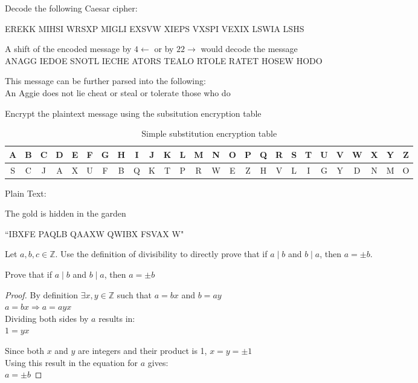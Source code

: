\documentclass[12pt]{article}
\begin{document}
\thispagestyle{empty}
\problem Decode the following Caesar cipher:
\begin{center}
EREKK MIHSI WRSXP MIGLI EXSVW XIEPS VXSPI VEXIX LSWIA LSHS
\end{center}

\solution
A shift of the encoded message by $4\leftarrow$ or by $22\rightarrow$ would decode the message\\
ANAGG IEDOE SNOTL IECHE ATORS TEALO RTOLE RATET HOSEW HODO

\noindent
This message can be further parsed into the following:\\
An Aggie does not lie cheat or steal or tolerate those who do

\problem Encrypt the plaintext message using the subsitution encryption table
\begin{table}[!ht]
    \centering
    \begin{tabular}{|c|c|c|c|c|c|c|c|c|c|c|c|c|c|c|c|c|c|c|c|c|c|c|c|c|c| }
        \hline
        A & B & C & D & E & F & G & H & I & J & K & L & M & N & O & P & Q & R & S & T & U & V & W & X & Y & Z \\
        \hline
        S & C & J & A & X & U & F & B & Q & K & T & P & R & W & E & Z & H & V & L & I & G & Y & D & N & M & O \\
        \hline
    \end{tabular}
    \caption{Simple substitution encryption table}
\end{table}

\noindent
Plain Text:
\begin{center}
The gold is hidden in the garden
\end{center}

\solution
``IBXFE PAQLB QAAXW QWIBX FSVAX W"

\newpage
\problem Let $a,b,c\in\mathbb{Z}$. Use the definition of divisibility to directly prove that if $a\mid b$ and $b\mid a$, then $a=\pm b$.

\solution 
Prove that if $a\mid b$ and $b\mid a$, then $a=\pm b$
\begin{proof}
By definition $\exists x,y\in\mathbb{Z}$ such that $a=bx$ and $b=ay$\\
$a = bx \Rightarrow a = ayx$\\
Dividing both sides by $a$ results in:\\
$1 = yx$

\noindent
Since both $x$ and $y$ are integers and their product is 1, $x=y=\pm 1$\\
Using this result in the equation for $a$ gives:\\
$a=\pm b$
\end{proof}
\end{document}
